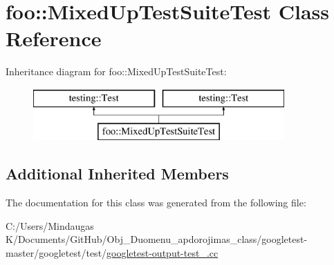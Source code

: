 \hypertarget{classfoo_1_1_mixed_up_test_suite_test}{}\section{foo\+::Mixed\+Up\+Test\+Suite\+Test Class Reference}
\label{classfoo_1_1_mixed_up_test_suite_test}
Inheritance diagram for foo\+::Mixed\+Up\+Test\+Suite\+Test\+:\begin{figure}[H]
\begin{center}
\leavevmode
\includegraphics[height=2.000000cm]{d4/dd4/classfoo_1_1_mixed_up_test_suite_test}
\end{center}
\end{figure}
\subsection*{Additional Inherited Members}


The documentation for this class was generated from the following file\+:\begin{DoxyCompactItemize}
\item 
C\+:/\+Users/\+Mindaugas K/\+Documents/\+Git\+Hub/\+Obj\+\_\+\+Duomenu\+\_\+apdorojimas\+\_\+class/googletest-\/master/googletest/test/\mbox{\hyperlink{googletest-master_2googletest_2test_2googletest-output-test___8cc}{googletest-\/output-\/test\+\_\+.\+cc}}\end{DoxyCompactItemize}
